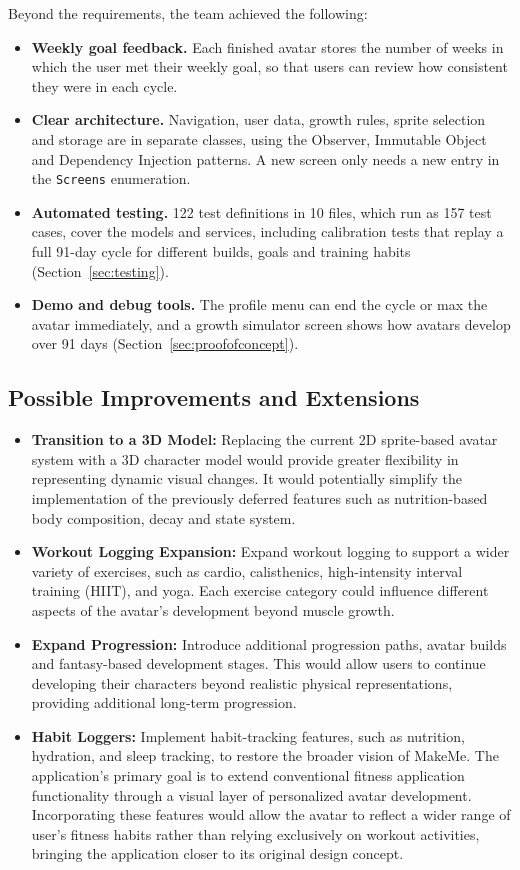 \documentclass[11pt]{article}
\begin{document}
Beyond the requirements, the team achieved the following:
\begin{itemize}
  \item \textbf{Weekly goal feedback.} Each finished avatar stores the number of weeks in which the user met their weekly goal, so that users can review how consistent they were in each cycle.
  \item \textbf{Clear architecture.} Navigation, user data, growth rules, sprite selection and storage are in separate classes, using the Observer, Immutable Object and Dependency Injection patterns. A new screen only needs a new entry in the \texttt{Screens} enumeration.
  \item \textbf{Automated testing.} 122 test definitions in 10 files, which run as 157 test cases, cover the models and services, including calibration tests that replay a full 91-day cycle for different builds, goals and training habits (Section~\ref{sec:testing}).
  \item \textbf{Demo and debug tools.} The profile menu can end the cycle or max the avatar immediately, and a growth simulator screen shows how avatars develop over 91 days (Section~\ref{sec:proofofconcept}).
\end{itemize}
\subsection{Possible Improvements and Extensions}
\label{sec:improvements}
\begin{itemize}
    \item \textbf{Transition to a 3D Model:} Replacing the current 2D sprite-based avatar system with a 3D character
        model would provide greater flexibility in representing dynamic visual changes. It would potentially simplify
        the implementation of the previously deferred features such as nutrition-based body composition, decay and state system.
    \item \textbf{Workout Logging Expansion:} Expand workout logging to support a wider variety of exercises, such as cardio, 
        calisthenics, high-intensity interval training (HIIT), and yoga. Each exercise category could
        influence different aspects of the avatar’s development beyond muscle growth.
    \item \textbf{Expand Progression:} Introduce additional progression paths, avatar builds and fantasy-based
        development stages. This would allow users to continue developing their characters beyond realistic
        physical representations, providing additional long-term progression.
    \item \textbf{Habit Loggers:} Implement habit-tracking features, such as nutrition, hydration, and sleep
        tracking, to restore the broader vision of MakeMe. The application’s primary goal is to extend
        conventional fitness application functionality through a visual layer of personalized avatar development. Incorporating these features would allow the avatar to reflect a wider range of user’s fitness habits rather than relying exclusively on workout activities, bringing the application closer to its original design concept.
\end{itemize}



\clearpage
\printbibliography[heading=bibnumbered, title={References}]
\clearpage
\end{document}

